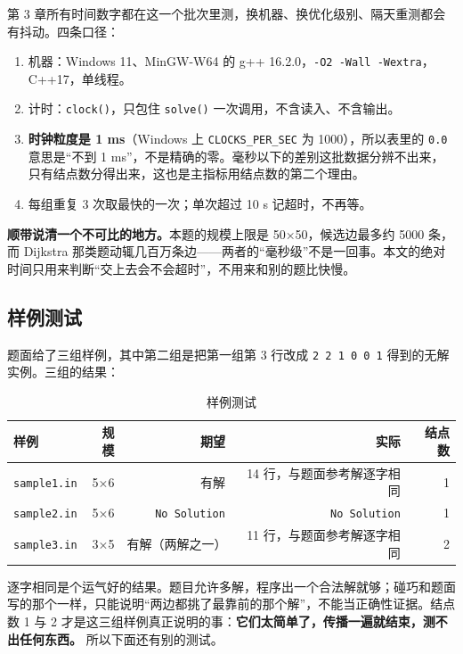 \documentclass[12pt,a4paper,fontset=windows]{ctexart}
\newcommand{\code}[1]{\texttt{#1}}
\begin{document}
第 3 章所有时间数字都在这一个批次里测，换机器、换优化级别、隔天重测都会有抖动。四条口径：

\begin{enumerate}[itemsep=2pt,topsep=2pt]
  \item 机器：Windows 11、MinGW-W64 的 g++ 16.2.0，\code{-O2 -Wall -Wextra}，C++17，单线程。
  \item 计时：\code{clock()}，只包住 \code{solve()} 一次调用，不含读入、不含输出。
  \item \textbf{时钟粒度是 1 ms}（Windows 上 \code{CLOCKS\_PER\_SEC} 为 1000），所以表里的 \code{0.0} 意思是“不到 1 ms”，不是精确的零。毫秒以下的差别这批数据分辨不出来，只有结点数分得出来，这也是主指标用结点数的第二个理由。
  \item 每组重复 3 次取最快的一次；单次超过 10 s 记超时，不再等。
\end{enumerate}

\textbf{顺带说清一个不可比的地方。}本题的规模上限是 50×50，候选边最多约 5000 条，而 Dijkstra 那类题动辄几百万条边——两者的“毫秒级”不是一回事。本文的绝对时间只用来判断“交上去会不会超时”，不用来和别的题比快慢。

\subsection{样例测试}

题面给了三组样例，其中第二组是把第一组第 3 行改成 \code{2 2 1 0 0 1} 得到的无解实例。三组的结果：

\begin{table}[htbp]
\centering
\caption{样例测试}
\label{tab:sample}
\small
\begin{tabular}{lrrrr}
\toprule
\rowcolor{gray!12}样例 & 规模 & 期望 & 实际 & 结点数 \\
\midrule
\code{sample1.in} & 5×6 & 有解 & 14 行，与题面参考解逐字相同 & 1 \\
\code{sample2.in} & 5×6 & \code{No Solution} & \code{No Solution} & 1 \\
\code{sample3.in} & 3×5 & 有解（两解之一） & 11 行，与题面参考解逐字相同 & 2 \\
\bottomrule
\end{tabular}
\end{table}

逐字相同是个运气好的结果。题目允许多解，程序出一个合法解就够；碰巧和题面写的那个一样，只能说明“两边都挑了最靠前的那个解”，不能当正确性证据。结点数 1 与 2 才是这三组样例真正说明的事：\textbf{它们太简单了，传播一遍就结束，测不出任何东西。} 所以下面还有别的测试。
\end{document}
